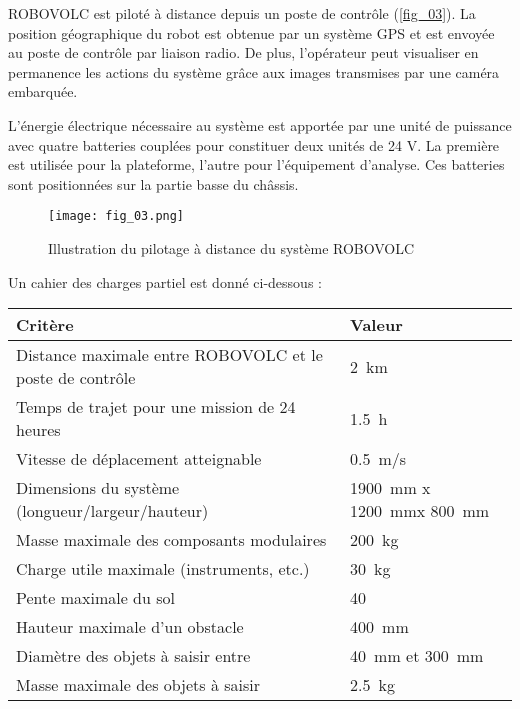 
ROBOVOLC est piloté à distance depuis un poste de contrôle (\autoref{fig_03}). La position géographique
du robot est obtenue par un système GPS et est envoyée au poste de contrôle par liaison radio.
De plus, l’opérateur peut visualiser en permanence les actions du système grâce aux images
transmises par une caméra embarquée.

L'énergie électrique nécessaire au système est apportée par une unité de puissance avec quatre
batteries couplées pour constituer deux unités de 24 V. La première est utilisée pour la plateforme,
l'autre pour l'équipement d'analyse. Ces batteries sont positionnées sur la partie basse du châssis.



\begin{figure}[H]
\centering
\texttt{[image: fig\_03.png]}
\caption{Illustration du pilotage à distance du système ROBOVOLC\label{fig_03}}
\end{figure}

Un cahier des charges partiel est donné ci-dessous :

\begin{center}
\begin{tabular}{ll}
\hline
\textbf{Critère} & \textbf{Valeur} \\ \hline \hline
Distance maximale entre ROBOVOLC et le poste de contrôle & \SI{2}{km} \\ \hline  
Temps de trajet pour une mission de 24 heures 		& \SI{1,5}{h} \\ \hline 
Vitesse de déplacement atteignable 				& \SI{0,5}{m/s} \\ \hline 
Dimensions du système (longueur/largeur/hauteur) 		& \SI{1900}{mm} x \SI{1200}{mm}x \SI{800}{mm}\\ \hline 
Masse maximale des composants modulaires 			& \SI{200}{kg} \\ \hline 
Charge utile maximale (instruments, etc.) 			& \SI{30}{kg} \\ \hline 
Pente maximale du sol 						& 40\degres \\ \hline 
Hauteur maximale d'un obstacle 					& \SI{400}{mm} \\ \hline 
Diamètre des objets à saisir entre 				& \SI{40}{mm} et \SI{300}{mm} \\ \hline 
Masse maximale des objets à saisir 				& \SI{2,5}{kg} \\ \hline 
\end{tabular}
\end{center}



